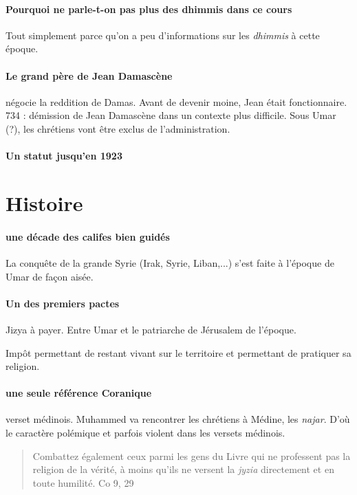 \paragraph{Pourquoi ne parle-t-on pas plus des dhimmis dans ce cours} Tout simplement parce qu'on a peu d'informations sur les \textit{dhimmis} à cette époque. 

 \paragraph{Le grand père de Jean Damascène} négocie la reddition de Damas. Avant de devenir moine, Jean était fonctionnaire. 734 : démission de Jean Damascène dans un contexte plus difficile. 
 Sous Umar (?), les chrétiens vont être exclus de l'administration.

 \paragraph{Un statut jusqu'en 1923}



 \section{Histoire}


 \paragraph{une décade des califes bien guidés} La conquête de la grande Syrie (Irak, Syrie, Liban,...) s'est faite à l'époque de Umar de façon aisée. 


 \paragraph{Un des premiers pactes} Jizya à payer. Entre Umar et le patriarche de Jérusalem de l'époque. 

 \begin{Def}[jizya]
     Impôt permettant de restant vivant sur le territoire et permettant de pratiquer sa religion.
 \end{Def}

\paragraph{une seule référence Coranique} verset médinois. Muhammed va rencontrer les chrétiens à Médine, les \textit{najar}. D'où le caractère polémique et parfois violent dans les versets médinois. 
 \begin{quote}
    Combattez également ceux parmi les gens du Livre qui ne professent pas la religion de la vérité, à moins qu'ils ne versent la \textit{jyzia } directement et en toute humilité.
     Co 9, 29
 \end{quote}

